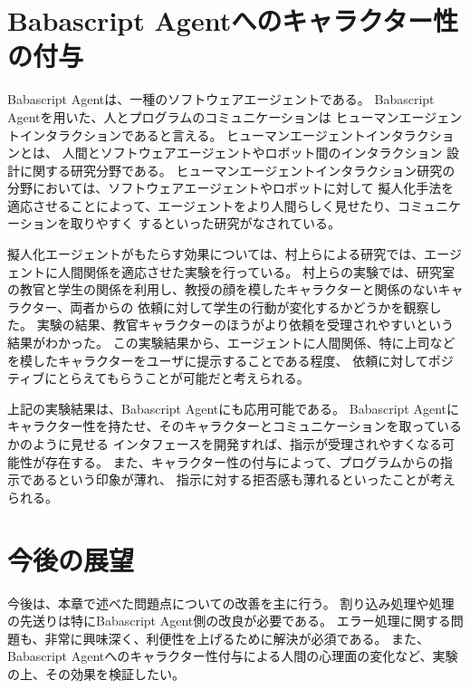 \section{Babascript
Agentへのキャラクター性の付与}\label{babascript-agentux3078ux306eux30adux30e3ux30e9ux30afux30bfux30fcux6027ux306eux4ed8ux4e0e}

Babascript Agentは、一種のソフトウェアエージェントである。 Babascript
Agentを用いた、人とプログラムのコミュニケーションは
ヒューマンエージェントインタラクションであると言える。
ヒューマンエージェントインタラクションとは、
人間とソフトウェアエージェントやロボット間のインタラクション
設計に関する研究分野である。
ヒューマンエージェントインタラクション研究の分野においては、ソフトウェアエージェントやロボットに対して
擬人化手法を適応させることによって、エージェントをより人間らしく見せたり、コミュニケーションを取りやすく
するといった研究がなされている。

擬人化エージェントがもたらす効果については、村上らによる研究\cite{murakami}では、エージェントに人間関係を適応させた実験を行っている。
村上らの実験では、研究室の教官と学生の関係を利用し、教授の顔を模したキャラクターと関係のないキャラクター、両者からの
依頼に対して学生の行動が変化するかどうかを観察した。
実験の結果、教官キャラクターのほうがより依頼を受理されやすいという結果がわかった。
この実験結果から、エージェントに人間関係、特に上司などを模したキャラクターをユーザに提示することである程度、
依頼に対してポジティブにとらえてもらうことが可能だと考えられる。

上記の実験結果は、Babascript Agentにも応用可能である。 Babascript
Agentにキャラクター性を持たせ、そのキャラクターとコミュニケーションを取っているかのように見せる
インタフェースを開発すれば、指示が受理されやすくなる可能性が存在する。
また、キャラクター性の付与によって、プログラムからの指示であるという印象が薄れ、
指示に対する拒否感も薄れるといったことが考えられる。

\section{今後の展望}\label{ux4ecaux5f8cux306eux5c55ux671b}

今後は、本章で述べた問題点についての改善を主に行う。
割り込み処理や処理の先送りは特にBabascript Agent側の改良が必要である。
エラー処理に関する問題も、非常に興味深く、利便性を上げるために解決が必須である。
また、Babascript
Agentへのキャラクター性付与による人間の心理面の変化など、実験の上、その効果を検証したい。
